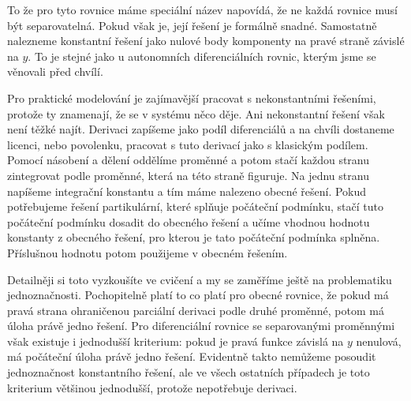 \documentclass[12pt]{article}
\begin{document}
To že pro tyto rovnice máme speciální název napovídá, že ne každá rovnice musí být separovatelná. Pokud však je, její řešení je formálně snadné. Samostatně nalezneme konstantní řešení jako nulové body komponenty na pravé straně závislé na $y$. To je stejné jako u autonomních diferenciálních rovnic, kterým jsme se věnovali před chvílí.

Pro praktické modelování je zajímavější pracovat s nekonstantními řešeními, protože ty znamenají, že se v systému něco děje. Ani nekonstantní řešení však není těžké najít. Derivaci zapíšeme jako podíl diferenciálů a na chvíli dostaneme licenci, nebo povolenku, pracovat s tuto derivací jako s klasickým podílem. Pomocí násobení a dělení oddělíme proměnné a potom stačí každou stranu zintegrovat podle proměnné, která na této straně figuruje. Na jednu stranu napíšeme integrační konstantu a tím máme nalezeno obecné řešení. Pokud potřebujeme řešení partikulární, které splňuje počáteční podmínku, stačí tuto počáteční podmínku dosadit do obecného řešení a učíme vhodnou hodnotu konstanty z obecného řešení, pro kterou je tato počáteční podmínka splněna. Příslušnou hodnotu potom použijeme v obecném řešením.

Detailněji si toto vyzkoušíte ve cvičení a my se zaměříme ještě na problematiku jednoznačnosti. Pochopitelně platí to co platí pro obecné rovnice, že pokud má pravá strana ohraničenou parciální derivaci podle druhé proměnné, potom má úloha právě jedno řešení. Pro diferenciální rovnice se separovanými proměnnými však existuje i jednodušší kriterium: pokud je pravá funkce závislá na $y$ nenulová, má počáteční úloha právě jedno řešení. Evidentně takto nemůžeme posoudit jednoznačnost konstantního řešení, ale ve všech ostatních případech je toto kriterium většinou jednodušší, protože nepotřebuje derivaci.
\end{document}
